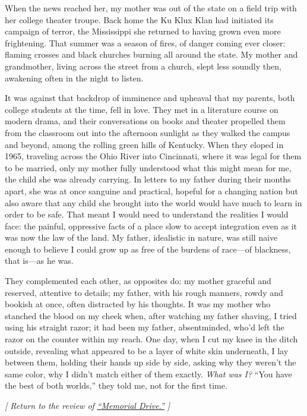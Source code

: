 When the news reached her, my mother was out of the state on a field
trip with her college theater troupe. Back home the Ku Klux Klan had
initiated its campaign of terror, the Mississippi she returned to having
grown even more frightening. That summer was a season of fires, of
danger coming ever closer: flaming crosses and black churches burning
all around the state. My mother and grandmother, living across the
street from a church, slept less soundly then, awakening often in the
night to listen.

It was against that backdrop of imminence and upheaval that my parents,
both college students at the time, fell in love. They met in a
literature course on modern drama, and their conversations on books and
theater propelled them from the classroom out into the afternoon
sunlight as they walked the campus and beyond, among the rolling green
hills of Kentucky. When they eloped in 1965, traveling across the Ohio
River into Cincinnati, where it was legal for them to be married, only
my mother fully understood what this might mean for me, the child she
was already carrying. In letters to my father during their months apart,
she was at once sanguine and practical, hopeful for a changing nation
but also aware that any child she brought into the world would have much
to learn in order to be safe. That meant I would need to understand the
realities I would face: the painful, oppressive facts of a place slow to
accept integration even as it was now the law of the land. My father,
idealistic in nature, was still naive enough to believe I could grow up
as free of the burdens of race---of blackness, that is---as he was.

They complemented each other, as opposites do: my mother graceful and
reserved, attentive to details; my father, with his rough manners, rowdy
and bookish at once, often distracted by his thoughts. It was my mother
who stanched the blood on my cheek when, after watching my father
shaving, I tried using his straight razor; it had been my father,
absentminded, who'd left the razor on the counter within my reach. One
day, when I cut my knee in the ditch outside, revealing what appeared to
be a layer of white skin underneath, I lay between them, holding their
hands up side by side, asking why they weren't the same color, why I
didn't match either of them exactly. \emph{What was I?} ``You have the
best of both worlds,'' they told me, not for the first time.

\emph{{[} Return to the review of}
\href{https://www.nytimes.com/2020/07/30/books/review/memorial-drive-natastha-trethewey.html}{\emph{``Memorial
Drive.''}} \emph{{]}}

